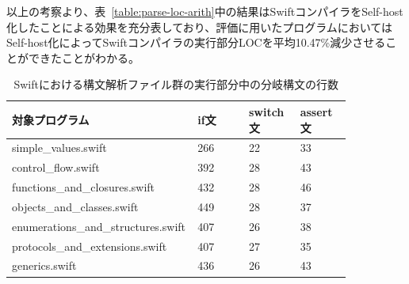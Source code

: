 以上の考察より、表~\ref{table:parse-loc-arith}中の結果はSwiftコンパイラをSelf-host化したことによる効果を充分表しており、評価に用いたプログラムにおいてはSelf-host化によってSwiftコンパイラの実行部分LOCを平均10.47\%減少させることができたことがわかる。

\begin{table}[!hbtp]
    \begin{center}
        \caption{Swiftにおける構文解析ファイル群の実行部分中の分岐構文の行数}
        \begin{tabular}{|p{0.4\linewidth}|p{0.15\linewidth}|p{0.15\linewidth}|p{0.15\linewidth}|}
            \hline
            対象プログラム & if文 & switch文 & assert文\\
            \hline
            \hline
            simple\_values.swift & 266 & 22 & 33\\
            \hline
            control\_flow.swift & 392 & 28 & 43\\
            \hline
            functions\_and\_closures.swift & 432 & 28 & 46\\
            \hline
            objects\_and\_classes.swift & 449 & 28 & 37\\
            \hline
            enumerations\_and\_structures.swift & 407 & 26 & 38\\
            \hline
            protocols\_and\_extensions.swift & 407 & 27 & 35\\
            \hline
            generics.swift & 436 & 26 & 43\\
            \hline
        \end{tabular}
        \label{table:branching-method-swift}
    \end{center}
\end{table}

